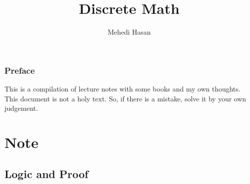 \documentclass[12pt,oneside,a4paper]{book}
\theoremstyle{remark}
\theoremstyle{definition}
\begin{document}
\title{Discrete Math}
\author{Mehedi Hasan}
\maketitle
\newpage
\section*{Preface}
This is a compilation of lecture notes with some books and my own thoughts. This document is not a holy text. So, if there is a mistake, solve it by your own judgement.
\newpage
\tableofcontents
\newpage
{}
\part{Note}
\chapter{Logic and Proof}
\end{document}
